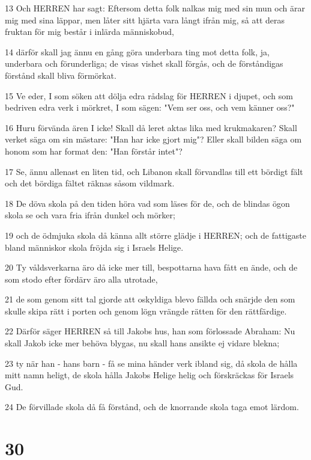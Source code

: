 \par 13 Och HERREN har sagt: Eftersom detta folk nalkas mig med sin mun och ärar mig med sina läppar, men låter sitt hjärta vara långt ifrån mig, så att deras fruktan för mig består i inlärda människobud,
\par 14 därför skall jag ännu en gång göra underbara ting mot detta folk, ja, underbara och förunderliga; de visas vishet skall förgås, och de förståndigas förstånd skall bliva förmörkat.
\par 15 Ve eder, I som söken att dölja edra rådslag för HERREN i djupet, och som bedriven edra verk i mörkret, I som sägen: "Vem ser oss, och vem känner oss?"
\par 16 Huru förvända ären I icke! Skall då leret aktas lika med krukmakaren? Skall verket säga om sin mästare: "Han har icke gjort mig"? Eller skall bilden säga om honom som har format den: "Han förstår intet"?
\par 17 Se, ännu allenast en liten tid, och Libanon skall förvandlas till ett bördigt fält och det bördiga fältet räknas såsom vildmark.
\par 18 De döva skola på den tiden höra vad som läses för de, och de blindas ögon skola se och vara fria ifrån dunkel och mörker;
\par 19 och de ödmjuka skola då känna allt större glädje i HERREN; och de fattigaste bland människor skola fröjda sig i Israels Helige.
\par 20 Ty våldsverkarna äro då icke mer till, bespottarna hava fått en ände, och de som stodo efter fördärv äro alla utrotade,
\par 21 de som genom sitt tal gjorde att oskyldiga blevo fällda och snärjde den som skulle skipa rätt i porten och genom lögn vrängde rätten för den rättfärdige.
\par 22 Därför säger HERREN så till Jakobs hus, han som förlossade Abraham: Nu skall Jakob icke mer behöva blygas, nu skall hans ansikte ej vidare blekna;
\par 23 ty när han - hans barn - få se mina händer verk ibland sig, då skola de hålla mitt namn heligt, de skola hålla Jakobs Helige helig och förskräckas för Israels Gud.
\par 24 De förvillade skola då få förstånd, och de knorrande skola taga emot lärdom.

\chapter{30}

